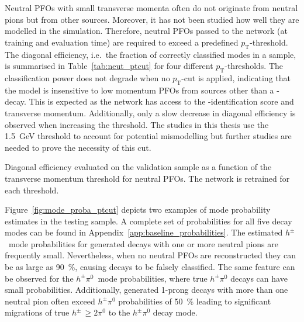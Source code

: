Neutral PFOs with small transverse momenta often do not originate from neutral
pions but from other sources. Moreover, it has not been studied how well they
are modelled in the simulation. Therefore, neutral PFOs passed to the network
(at training and evaluation time) are required to exceed a predefined
$p_\text{T}$-threshold. The diagonal efficiency, i.e.\ the fraction of correctly
classified modes in a sample, is summarised in Table~\ref{tab:neut_ptcut} for
four different $p_\text{T}$-thresholds. The classification power does not
degrade when no $p_\text{T}$-cut is applied, indicating that the model is
insensitive to low momentum PFOs from sources other than a
-decay. This is expected as the network has access to the
-identification score and transverse momentum. Additionally, only
a slow decrease in diagonal efficiency is observed when increasing the
threshold. The studies in this thesis use the \SI{1.5}{\giga\electronvolt}
threshold to account for potential mismodelling but further studies are needed
to prove the necessity of this cut.

\begin{table}[htb]
  \centering
  {\small}
  \caption[Diagonal efficiency after applying \pt thresholds on neutral
  PFOs]{Diagonal efficiency evaluated on the validation sample as a function of
    the transverse momentum threshold for neutral PFOs. The network is retrained
    for each threshold.}
  \label{tab:neut_ptcut}
\end{table}

Figure~\ref{fig:mode_proba_ptcut} depicts two examples of mode probability
estimates in the testing sample. A complete set of probabilities for all five
decay modes can be found in Appendix~\ref{app:baseline_probabilities}. The
estimated $h^\pm$~mode probabilities for generated decays with one or more
neutral pions are frequently small. Nevertheless, when no neutral PFOs are
reconstructed they can be as large as \SI{90}{\percent}, causing decays to be
falsely classified. The same feature can be observed for the $h^\pm \pi^0$~mode
probabilities, where true $h^\pm \pi^0$ decays can have small probabilities.
Additionally, generated 1-prong decays with more than one neutral pion often
exceed $h^\pm \pi^0$ probabilities of \SI{50}{\percent} leading to significant
migrations of true $h^\pm \, {\geq} 2 \pi^0$ to the $h^\pm \pi^0$ decay mode.

